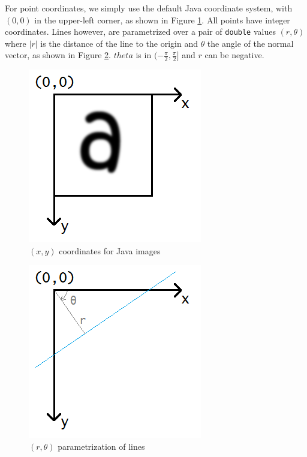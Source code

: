 \documentclass[10pt,a4paper]{article}			%
\begin{document}
For point coordinates, we simply use the default Java coordinate system, with $(0,0)$ in the upper-left corner, as shown in Figure \ref{coordinates}. All points have integer coordinates. Lines however, are parametrized over a pair of \texttt{double} values $(r,\theta)$ where $|r|$ is the distance of the line to the origin and $\theta$ the angle of the normal vector, as shown in Figure \ref{lines_parametrization}. $theta$ is in $(-\frac{\pi}{2},\frac{\pi}{2}]$ and $r$ can be negative.
\begin{figure}[h]
\includegraphics[scale=0.5]{img/coordinates.png}
\caption{$(x,y)$ coordinates for Java images}
\label{coordinates}
\end{figure}
\begin{figure}[h]
\includegraphics[scale=0.7]{img/lines.png}
\caption{$(r,\theta)$ parametrization of lines}
\label{lines_parametrization}
\end{figure}
\end{document}
